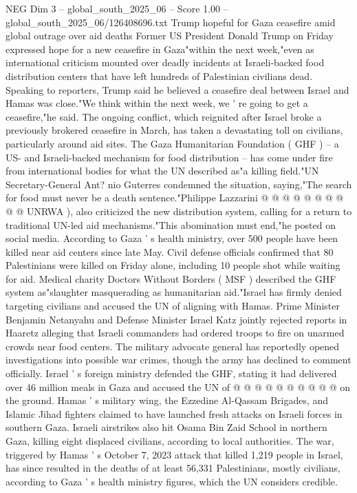 \begin{textsample}{NEG Dim 3 – global\_south\_2025\_06 – Score 1.00 – global\_south\_2025\_06/126408696.txt}  \label{ex:f3_neg_257}
Trump hopeful for Gaza ceasefire amid global outrage over aid deaths Former US President Donald Trump on Friday expressed hope for a new ceasefire in Gaza"within the next week,"even as international criticism mounted over deadly incidents at Israeli-backed food distribution centers that have left hundreds of Palestinian civilians dead.
Speaking to reporters, Trump said he believed a ceasefire deal between Israel and Hamas was close."We think within the next week, we ' re going to get a ceasefire,"he said.
The ongoing conflict, which reignited after Israel broke a previously brokered ceasefire in March, has taken a devastating toll on civilians, particularly around aid sites.
The Gaza Humanitarian Foundation ( GHF ) -- a US- and Israeli-backed mechanism for food distribution -- has come under fire from international bodies for what the UN described as"a killing field."UN Secretary-General Ant? nio Guterres condemned the situation, saying,"The search for food must never be a death sentence."Philippe Lazzarini @ @ @ @ @ @ @ @ @ @ UNRWA ), also criticized the new distribution system, calling for a return to traditional UN-led aid mechanisms."This abomination must end,"he posted on social media.
According to Gaza ' s health ministry, over 500 people have been killed near aid centers since late May.
Civil defense officials confirmed that 80 Palestinians were killed on Friday alone, including 10 people shot while waiting for aid.
Medical charity Doctors Without Borders ( MSF ) described the GHF system as"slaughter masquerading as humanitarian aid."Israel has firmly denied targeting civilians and accused the UN of aligning with Hamas.
Prime Minister Benjamin Netanyahu and Defense Minister Israel Katz jointly rejected reports in Haaretz alleging that Israeli commanders had ordered troops to fire on unarmed crowds near food centers.
The military advocate general has reportedly opened investigations into possible war crimes, though the army has declined to comment officially.
Israel ' s foreign ministry defended the GHF, stating it had delivered over 46 million meals in Gaza and accused the UN of @ @ @ @ @ @ @ @ @ @ on the ground.
Hamas ' s military wing, the Ezzedine Al-Qassam Brigades, and Islamic Jihad fighters claimed to have launched fresh attacks on Israeli forces in southern Gaza.
Israeli airstrikes also hit Osama Bin Zaid School in northern Gaza, killing eight displaced civilians, according to local authorities.
The war, triggered by Hamas ' s October 7, 2023 attack that killed 1,219 people in Israel, has since resulted in the deaths of at least 56,331 Palestinians, mostly civilians, according to Gaza ' s health ministry figures, which the UN considers credible.

\end{textsample}
